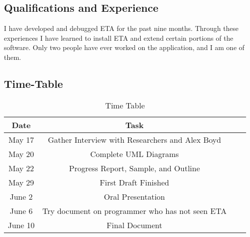\documentclass[a4paper,12pt]{texMemo}
\begin{document}
\subsection*{Qualifications and Experience}
I have developed and debugged ETA for the past nine months. Through these experiences I have learned to install ETA and extend certain portions of the software. Only two people have ever worked on the application, and I am one of them. 

\subsection*{Time-Table}
\begin{table}[ht]
\caption{Time Table} %
\centering  %
\begin{tabular}{c c c c} %
\hline\hline                        %
Date & Task\\ %
\hline                  %
May 17 & Gather Interview with Researchers and Alex Boyd \\
May 20 & Complete UML Diagrams \\
May 22 & Progress Report, Sample, and Outline  \\
May 29 & First Draft Finished\\
June 2 & Oral Presentation &  \\
June 6 & Try document on programmer who has not seen ETA \\
June 10 & Final Document &  \\ [1ex]      %
\hline %
\end{tabular}
\label{table:nonlin} %
\end{table}


 

 \setlength{\parindent}{0.5in} 



\end{document}
